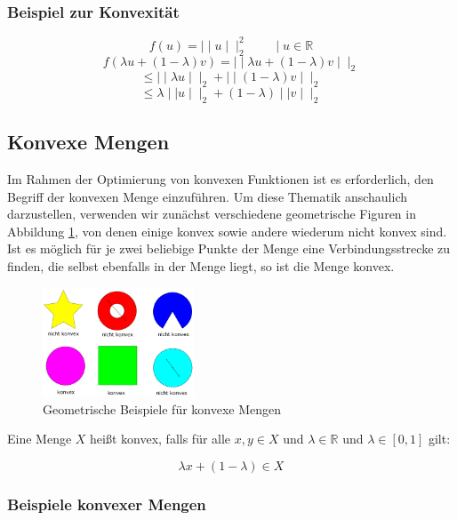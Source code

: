 \begin{theorem}
\begin{Def}
\begin{Def}
	\subsubsection{Beispiel zur Konvexität}
	\[f(u)=\mid\mid u\mid\mid_2^2\qquad\mid u\in\mathbb{R}\]
	\[f(\lambda u+(1-\lambda)v)=\mid\mid\lambda u+(1-\lambda)v\mid\mid_2\]
	\[\leq\mid\mid\lambda u\mid\mid_2+\mid\mid(1-\lambda)v\mid\mid_2\]
	\[\leq\lambda\mid\mid u\mid\mid_2+(1-\lambda)\mid\mid v\mid\mid_2\]
\subsection{Konvexe Mengen}

Im Rahmen der Optimierung von konvexen Funktionen ist es erforderlich, den Begriff der konvexen Menge einzuführen. Um diese Thematik anschaulich darzustellen, verwenden wir zunächst verschiedene geometrische Figuren in Abbildung \ref{figure:konvexe-mengen}, von denen einige konvex sowie andere wiederum nicht konvex sind.
Ist es möglich für je zwei beliebige Punkte der Menge eine Verbindungsstrecke zu finden, die selbst ebenfalls in der Menge liegt, so ist die Menge konvex.

\begin{figure}[h]
\centering
\label{figure:konvexe-mengen}
\includegraphics[width=0.40\textwidth]{konvexe-mengen.pdf}
\caption{Geometrische Beispiele für konvexe Mengen}
\end{figure}


\begin{Def}

Eine Menge $X$ heißt konvex, falls für alle $x, y \in X$ und $\lambda \in \mathbb{R}$ und $\lambda \in [0,1]$ gilt:

\begin{equation}
\lambda x + (1 - \lambda) \in X
\end{equation}

\end{Def}

\subsubsection{Beispiele konvexer Mengen}


\end{Def}
\end{Def}
\end{theorem}
